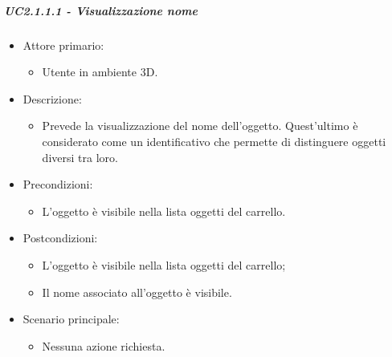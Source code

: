 \subparagraph{UC2.1.1.1 - Visualizzazione nome}
\begin{itemize}
	
	\item Attore primario: 
	\begin{itemize}
		\item Utente in ambiente 3D.
	\end{itemize}
	\item Descrizione:
	\begin{itemize}
		\item Prevede la visualizzazione del nome dell’oggetto. Quest'ultimo è considerato come un identificativo che permette di distinguere oggetti diversi tra loro.
	\end{itemize}
	
	\item Precondizioni:
	\begin{itemize}
		\item L'oggetto è visibile nella lista oggetti del carrello.
	\end{itemize}
	
	\item Postcondizioni:
	\begin{itemize}
		\item L'oggetto è visibile nella lista oggetti del carrello;
		\item Il nome associato all'oggetto è visibile.
	\end{itemize}
	
	\item Scenario principale:
	\begin{itemize}
		\item Nessuna azione richiesta.
	\end{itemize}
	
\end{itemize}

